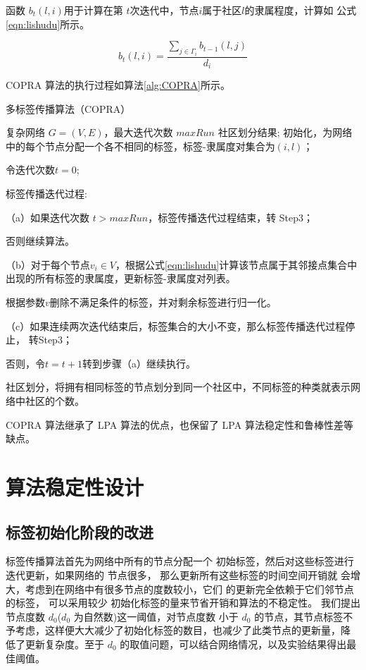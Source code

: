 函数 $b_t(l, i)$用于计算在第 $t $次迭代中，节点$ i $属于社区$ l $的隶属程度，计算如
公式\ref{eqn:lishudu}所示。

\begin{equation}
  \label{eqn:lishudu}
  b_t(l,i)=\frac{\sum_{j\in \Gamma_i }b_{t-1}(l,j)}{d_i}
\end{equation}

COPRA 算法的执行过程如算法\ref{alg:COPRA}所示。

\begin{algorithm}[htb]  
  \caption{多标签传播算法（COPRA）}  
  \label{alg:COPRA}  
  \begin{algorithmic}[1]  
    \Require  
    复杂网络 $G = (V, E)$，最大迭代次数 $maxRun$   
    \Ensure  
      社区划分结果;  
    \State 初始化，为网络中的每个节点分配一个各不相同的标签，标签-隶属度对集合为${(i,l)}$；
    
          令迭代次数$t=0$;  

    \State 标签传播迭代过程:

    （a）如果迭代次数 $t > maxRun$，标签传播迭代过程结束，转 Step3；
    
    否则继续算法。 

    （b）对于每个节点$v_i\in V$，根据公式\ref{eqn:lishudu}计算该节点属于其邻接点集合中出现的所有标签的隶属度，更新标签-隶属度对列表。
    
    根据参数$v$删除不满足条件的标签，并对剩余标签进行归一化。 
     
    （c）如果连续两次迭代结束后，标签集合的大小不变，那么标签传播迭代过程停止，
    转Step3；
    
    否则，令$t = t+1$转到步骤（a）继续执行。

    \State 社区划分，将拥有相同标签的节点划分到同一个社区中，不同标签的种类就表示网络中社区的个数。
  \end{algorithmic}  
\end{algorithm} 

COPRA 算法继承了 LPA 算法的优点，也保留了 LPA 算法稳定性和鲁棒性差等缺点。 

\section{算法稳定性设计}
\subsection{标签初始化阶段的改进}
标签传播算法首先为网络中所有的节点分配一个
初始标签，然后对这些标签进行迭代更新，如果网络的 节点很多， 那么更新所有这些标签的时间空间开销就 会增大，考虑到在网络中有很多节点的度数较小，它们 的更新完全依赖于它们邻节点的标签， 可以采用较少 初始化标签的量来节省开销和算法的不稳定性。 我们提出节点度数 $d_0$($d_0$ 为自然数)这一阈值，对节点度数 小于 $d_0$ 的节点，其节点标签不予考虑，这样便大大减少了初始化标签的数目，也减少了此类节点的更新量，降 低了更新复杂度。至于 $d_0$ 的取值问题，可以结合网络情况，以及实验结果得出最佳阈值。

